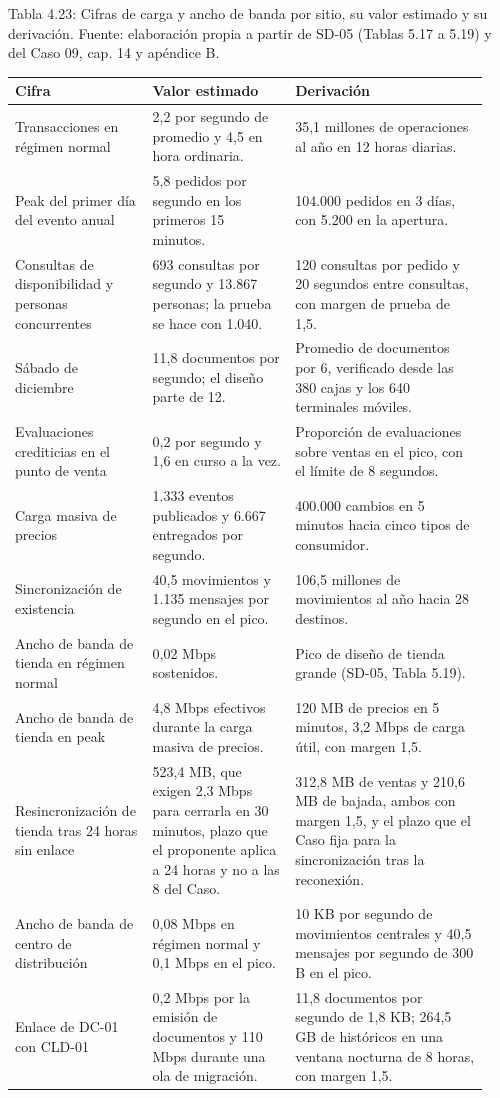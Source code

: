 \documentclass[11pt]{article}
\begin{document}
Tabla 4.23: Cifras de carga y ancho de banda por sitio, su valor estimado y su derivación. Fuente: elaboración propia a partir de SD-05 (Tablas 5.17 a 5.19) y del Caso 09, cap. 14 y apéndice B.\par\nopagebreak
\begin{longtable}{@{}p{0.27\linewidth}p{0.29\linewidth}p{0.38\linewidth}@{}}
\toprule Cifra & Valor estimado & Derivación \\
\midrule\endhead\bottomrule\endlastfoot
Transacciones en régimen normal & 2,2 por segundo de promedio y 4,5 en hora ordinaria. & 35,1 millones de operaciones al año en 12 horas diarias. \\
Peak del primer día del evento anual & 5,8 pedidos por segundo en los primeros 15 minutos. & 104.000 pedidos en 3 días, con 5.200 en la apertura. \\
Consultas de disponibilidad y personas concurrentes & 693 consultas por segundo y 13.867 personas; la prueba se hace con 1.040. & 120 consultas por pedido y 20 segundos entre consultas, con margen de prueba de 1,5. \\
Sábado de diciembre & 11,8 documentos por segundo; el diseño parte de 12. & Promedio de documentos por 6, verificado desde las 380 cajas y los 640 terminales móviles. \\
Evaluaciones crediticias en el punto de venta & 0,2 por segundo y 1,6 en curso a la vez. & Proporción de evaluaciones sobre ventas en el pico, con el límite de 8 segundos. \\
Carga masiva de precios & 1.333 eventos publicados y 6.667 entregados por segundo. & 400.000 cambios en 5 minutos hacia cinco tipos de consumidor. \\
Sincronización de existencia & 40,5 movimientos y 1.135 mensajes por segundo en el pico. & 106,5 millones de movimientos al año hacia 28 destinos. \\
Ancho de banda de tienda en régimen normal & 0,02 Mbps sostenidos. & Pico de diseño de tienda grande (SD-05, Tabla 5.19). \\
Ancho de banda de tienda en peak & 4,8 Mbps efectivos durante la carga masiva de precios. & 120 MB de precios en 5 minutos, 3,2 Mbps de carga útil, con margen 1,5. \\
Resincronización de tienda tras 24 horas sin enlace & 523,4 MB, que exigen 2,3 Mbps para cerrarla en 30 minutos, plazo que el proponente aplica a 24 horas y no a las 8 del Caso. & 312,8 MB de ventas y 210,6 MB de bajada, ambos con margen 1,5, y el plazo que el Caso fija para la sincronización tras la reconexión. \\
Ancho de banda de centro de distribución & 0,08 Mbps en régimen normal y 0,1 Mbps en el pico. & 10 KB por segundo de movimientos centrales y 40,5 mensajes por segundo de 300 B en el pico. \\
Enlace de DC-01 con CLD-01 & 0,2 Mbps por la emisión de documentos y 110 Mbps durante una ola de migración. & 11,8 documentos por segundo de 1,8 KB; 264,5 GB de históricos en una ventana nocturna de 8 horas, con margen 1,5. \\
\end{longtable}
\end{document}
